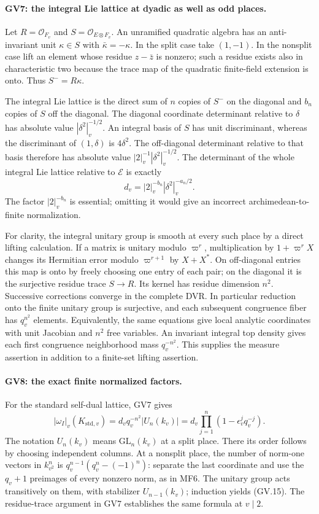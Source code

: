 \paragraph{GV7: the integral Lie lattice at dyadic as well as odd places.}
Let $R=\mathcal O_{F_v}$ and $S=\mathcal O_{E\otimes F_v}$.
An unramified quadratic algebra has an anti-invariant unit
$\kappa\in S$ with $\bar\kappa=-\kappa$. In the split case take
$(1,-1)$. In the nonsplit case lift an element whose residue
$z-\bar z$ is nonzero; such a residue exists also in characteristic
two because the trace map of the quadratic finite-field extension
is onto. Thus $S^- =R\kappa$.

The integral Lie lattice is the direct sum of $n$ copies of $S^-$
on the diagonal and $b_n$ copies of $S$ off the diagonal. The diagonal
coordinate determinant relative to $\delta$ has absolute value
$|\delta^2|_v^{-1/2}$. An integral basis of $S$ has unit
discriminant, whereas the discriminant of $(1,\delta)$ is
$4\delta^2$. The off-diagonal determinant relative to that basis
therefore has absolute value $|2|_v^{-1}|\delta^2|_v^{-1/2}$.
The determinant of the whole integral Lie lattice relative to
$\mathcal E$ is exactly
\[
 d_v=|2|_v^{-b_n}|\delta^2|_v^{-a_n/2}.
 \tag{GV.14}
\]
The factor $|2|_v^{-b_n}$ is essential; omitting it would give an
incorrect archimedean-to-finite normalization.

For clarity, the integral unitary group is smooth at every such
place by a direct lifting calculation. If a matrix is unitary modulo
$\varpi^r$, multiplication by $1+\varpi^r X$ changes its Hermitian
error modulo $\varpi^{r+1}$ by $X+X^*$. On off-diagonal entries this
map is onto by freely choosing one entry of each pair; on the
diagonal it is the surjective residue trace $S\to R$. Its kernel
has residue dimension $n^2$. Successive corrections converge in
the complete DVR. In particular reduction onto the finite unitary
group is surjective, and each subsequent congruence fiber has
$q_v^{n^2}$ elements. Equivalently, the same equations give local
analytic coordinates with unit Jacobian and $n^2$ free variables.
An invariant integral top density gives each first congruence
neighborhood mass $q_v^{-n^2}$. This supplies the measure assertion
in addition to a finite-set lifting assertion.

\paragraph{GV8: the exact finite normalized factors.}
For the standard self-dual lattice, GV7 gives
\[
 |\omega_I|_v(K_{\mathrm{std},v})
       =d_vq_v^{-n^2}|U_n(k_v)|
       =d_v\prod_{j=1}^n(1-\epsilon_v^j q_v^{-j}).
 \tag{GV.15}
\]
The notation $U_n(k_v)$ means $\mathrm{GL}_n(k_v)$ at a split
place. There its order follows by choosing independent columns.
At a nonsplit place, the number of norm-one vectors in $k_{v^2}^n$
is $q_v^{n-1}(q_v^n-(-1)^n)$: separate the last coordinate and use
the $q_v+1$ preimages of every nonzero norm, as in MF6. The unitary
group acts transitively on them, with stabilizer $U_{n-1}(k_v)$;
induction yields (GV.15). The residue-trace argument in GV7
establishes the same formula at $v\mid2$.

